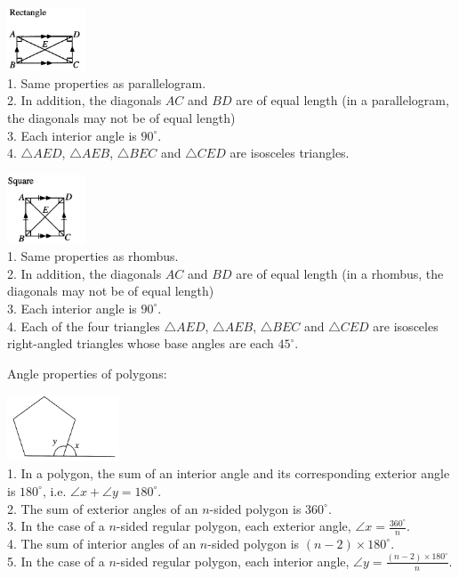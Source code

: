 \documentclass[twocolumn]{article}
\begin{document}
\begin{enumerate}
\bigskip

\includegraphics[width=0.175\textwidth]{34.png} \\
1. Same properties as parallelogram. \\
2. In addition, the diagonals $AC$ and $BD$ are of equal length (in a parallelogram, the diagonals may not be of equal length) \\
3. Each interior angle is $90^\circ$. \\
4. $\triangle AED$, $\triangle AEB$, $\triangle BEC$ and $\triangle CED$ are isosceles triangles.

\bigskip

\includegraphics[width=0.175\textwidth]{35.png} \\
1. Same properties as rhombus. \\
2. In addition, the diagonals $AC$ and $BD$ are of equal length (in a rhombus, the diagonals may not be of equal length) \\
3. Each interior angle is $90^\circ$. \\
4. Each of the four triangles $\triangle AED$, $\triangle AEB$, $\triangle BEC$ and $\triangle CED$ are isosceles right-angled triangles whose base angles are each $45^\circ$.

\bigskip

\noindent
Angle properties of polygons:

\bigskip

\includegraphics[width=0.25\textwidth]{40.png} \\
1. In a polygon, the sum of an interior angle and its corresponding exterior angle is $180^{\circ}$, i.e. $\angle x+\angle y=180^{\circ}$. \\
2. The sum of exterior angles of an $n$-sided polygon is $360^{\circ}$. \\
3. In the case of a $n$-sided regular polygon, each exterior angle, $\angle x=\frac{360^{\circ}}{n}$. \\
4. The sum of interior angles of an $n$-sided polygon is $(n-2) \times 180^{\circ}$. \\
5. In the case of a $n$-sided regular polygon, each interior angle, $\angle y=\frac{(n-2) \times 180^{\circ}}{n}$.


\end{enumerate}
\end{document}

